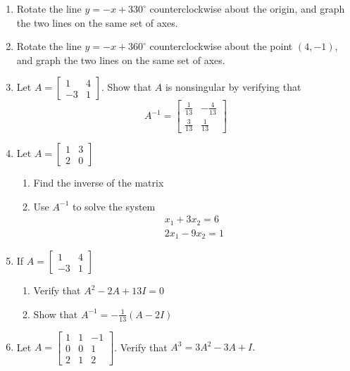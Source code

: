 \documentclass[../main.tex]{subfiles}
\begin{document}
\begin{enumerate}[label=\textbf{1.\arabic*}]
\item Rotate the line $y=-x+330^{\circ}$ counterclockwise about the origin, and graph the two lines on the same set of axes.

\item Rotate the line $y=-x+360^{\circ}$ counterclockwise about the point $(4,-1)$, and graph the two lines on the same set of axes.

\item Let $A=\left[\begin{array}{cc}1 & 4 \\ -3 & 1\end{array}\right]$. Show that $A$ is nonsingular by verifying that
$$
A^{-1}=\left[\begin{array}{cc}
\frac{1}{13} & -\frac{4}{13} \\
\frac{3}{13} & \frac{1}{13}
\end{array}\right]
$$

\item Let $A=\left[\begin{array}{ll}1 & 3 \\ 2 & 0\end{array}\right]$

	\begin{enumerate}[label = \textbf{\alph*.}]
		\item Find the inverse of the matrix
		\item Use $A^{-1}$ to solve the system
		$$
		\begin{array}{r}
		x_{1}+3 x_{2}=6 \\
		2 x_{1}-9 x_{2}=1
		\end{array}
		$$
	\end{enumerate}

\item If $A=\left[\begin{array}{cc}1 & 4 \\ -3 & 1\end{array}\right]$
	\begin{enumerate}[label = \textbf{\alph*.}]
		\item Verify that $A^{2}-2 A+13 I=0$
		\item Show that $A^{-1}=-\frac{1}{13}(A-2 I)$
	\end{enumerate}

\item Let $A=\left[\begin{array}{ccc}1 & 1 & -1 \\ 0 & 0 & 1 \\ 2 & 1 & 2\end{array}\right]$. Verify that $A^{3}=3 A^{2}-3 A+I .$


\end{enumerate}
\end{document}
